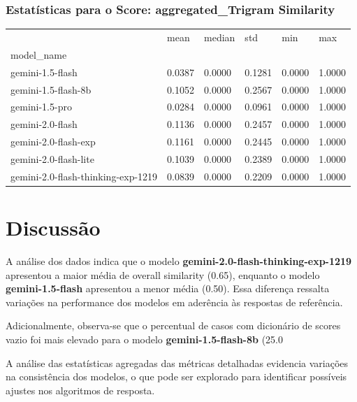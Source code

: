 \documentclass{article}%
\begin{document}
\subsubsection*{Estatísticas para o Score: aggregated\_Trigram Similarity}%
\begin{table}[H]%
\centering%
\begin{tabular}{llllll}
\toprule
 & mean & median & std & min & max \\
model_name &  &  &  &  &  \\
\midrule
gemini-1.5-flash & 0.0387 & 0.0000 & 0.1281 & 0.0000 & 1.0000 \\
gemini-1.5-flash-8b & 0.1052 & 0.0000 & 0.2567 & 0.0000 & 1.0000 \\
gemini-1.5-pro & 0.0284 & 0.0000 & 0.0961 & 0.0000 & 1.0000 \\
gemini-2.0-flash & 0.1136 & 0.0000 & 0.2457 & 0.0000 & 1.0000 \\
gemini-2.0-flash-exp & 0.1161 & 0.0000 & 0.2445 & 0.0000 & 1.0000 \\
gemini-2.0-flash-lite & 0.1039 & 0.0000 & 0.2389 & 0.0000 & 1.0000 \\
gemini-2.0-flash-thinking-exp-1219 & 0.0839 & 0.0000 & 0.2209 & 0.0000 & 1.0000 \\
\bottomrule
\end{tabular}
%
\end{table}%
\vspace{0.5cm}

%
\section*{Discussão}%
\label{sec:Discusso}%

A análise dos dados indica que o modelo \textbf{gemini-2.0-flash-thinking-exp-1219} apresentou a maior média de overall similarity (0.65), 
enquanto o modelo \textbf{gemini-1.5-flash} apresentou a menor média (0.50). Essa diferença ressalta variações na performance 
dos modelos em aderência às respostas de referência.

Adicionalmente, observa-se que o percentual de casos com dicionário de scores vazio foi mais elevado para o modelo 
\textbf{gemini-1.5-flash-8b} (25.0%

A análise das estatísticas agregadas das métricas detalhadas evidencia variações na consistência dos modelos, o que pode ser explorado 
para identificar possíveis ajustes nos algoritmos de resposta.
\end{document}
